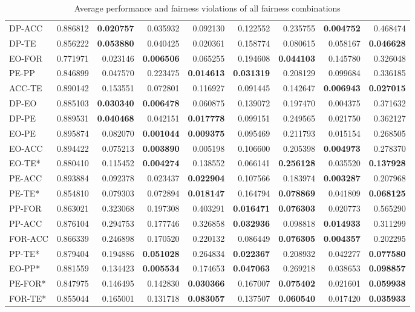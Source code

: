 \begin{table}[htbp]{}
{\begin{tabular}{|l|r|r|r|r|r|r|r|r|}
    DP-ACC & 0.886812 & \textbf{0.020757} & 0.035932 & 0.092130 & 0.122552 & 0.235755 & \textbf{0.004752} & 0.468474 \\
    DP-TE & 0.856222 & \textbf{0.053880} & 0.040425 & 0.020361 & 0.158774 & 0.080615 & 0.058167 & \textbf{0.046628} \\
    EO-FOR & 0.771971 & 0.023146 & \textbf{0.006506} & 0.065255 & 0.194608 & \textbf{0.044103} & 0.145780 & 0.326048 \\
    PE-PP & 0.846899 & 0.047570 & 0.223475 & \textbf{0.014613} & \textbf{0.031319} & 0.208129 & 0.099684 & 0.336185 \\
    ACC-TE & 0.890142 & 0.153551 & 0.072801 & 0.116927 & 0.091445 & 0.142647 & \textbf{0.006943} & \textbf{0.027015} \\
    \hline
    DP-EO & 0.885103 & \textbf{0.030340} & \textbf{0.006478} & 0.060875 & 0.139072 & 0.197470 & 0.004375 & 0.371632 \\
    DP-PE & 0.889531 & \textbf{0.040468} & 0.042151 & \textbf{0.017778} & 0.099151 & 0.249565 & 0.021750 & 0.362127 \\
    EO-PE & 0.895874 & 0.082070 & \textbf{0.001044} & \textbf{0.009375} & 0.095469 & 0.211793 & 0.015154 & 0.268505 \\
    EO-ACC & 0.894422 & 0.075213 & \textbf{0.003890} & 0.005198 & 0.106600 & 0.205398 & \textbf{0.004973} & 0.278370 \\
    EO-TE* & 0.880410 & 0.115452 & \textbf{0.004274} & 0.138552 & 0.066141 & \textbf{0.256128} & 0.035520 & \textbf{0.137928} \\
    PE-ACC & 0.893884 & 0.092378 & 0.023437 & \textbf{0.022904} & 0.107566 & 0.183974 & \textbf{0.003287} & 0.207968 \\
    PE-TE* & 0.854810 & 0.079303 & 0.072894 & \textbf{0.018147} & 0.164794 & \textbf{0.078869} & 0.041809 & \textbf{0.068125} \\
    PP-FOR & 0.863021 & 0.323068 & 0.197308 & 0.403291 & \textbf{0.016471} & \textbf{0.076303} & 0.020773 & 0.565290 \\
    PP-ACC & 0.876104 & 0.294753 & 0.177746 & 0.326858 & \textbf{0.032936} & 0.098818 & \textbf{0.014933} & 0.311299 \\
    FOR-ACC & 0.866339 & 0.246898 & 0.170520 & 0.220132 & 0.086449 & \textbf{0.076305} & \textbf{0.004357} & 0.202295 \\
    PP-TE* & 0.879404 & 0.194886 & \textbf{0.051028} & 0.264834 & \textbf{0.022367} & 0.208932 & 0.042277 & \textbf{0.077580} \\
    EO-PP* & 0.881559 & 0.134423 & \textbf{0.005534} & 0.174653 & \textbf{0.047063} & 0.269218 & 0.038653 & \textbf{0.098857} \\
    PE-FOR* & 0.847975 & 0.146495 & 0.142830 & \textbf{0.030366} & 0.167007 & \textbf{0.075402} & 0.021601 & \textbf{0.059938} \\
    FOR-TE* & 0.855044 & 0.165001 & 0.131718 & \textbf{0.083057} & 0.137507 & \textbf{0.060540} & 0.017420 & \textbf{0.035933} \\\hline
    \end{tabular}}
    \caption{Average performance and fairness violations of all fairness combinations}
    \label{table:combined}
\end{table}